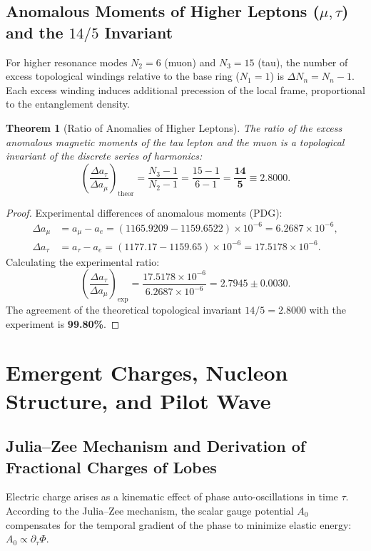 \documentclass[12pt,a4paper]{article}
\newtheorem{theorem}{Theorem}
\begin{document}
	\subsection{Anomalous Moments of Higher Leptons ($\mu, \tau$) and the $14/5$ Invariant}
	For higher resonance modes $N_2=6$ (muon) and $N_3=15$ (tau), the number of excess topological windings relative to the base ring ($N_1=1$) is $\Delta N_n = N_n - 1$. Each excess winding induces additional precession of the local frame, proportional to the entanglement density.
				
	\begin{theorem}[Ratio of Anomalies of Higher Leptons]
	The ratio of the excess anomalous magnetic moments of the tau lepton and the muon is a topological invariant of the discrete series of harmonics:
	\begin{equation}
	\left( \frac{\Delta a_\tau}{\Delta a_\mu} \right)_{\mathrm{theor}} = \frac{N_3 - 1}{N_2 - 1} = \frac{15 - 1}{6 - 1} = \mathbf{\frac{14}{5} \equiv 2.8000}.
	\end{equation}
	\end{theorem}
					
	\begin{proof}
	Experimental differences of anomalous moments (PDG):
	\begin{align}
	\Delta a_\mu &= a_\mu - a_e = (1165.9209 - 1159.6522) \times 10^{-6} = 6.2687 \times 10^{-6}, \\
	\Delta a_\tau &= a_\tau - a_e = (1177.17 - 1159.65) \times 10^{-6} = 17.5178 \times 10^{-6}.
	\end{align}
	Calculating the experimental ratio:
	\begin{equation}
	\left( \frac{\Delta a_\tau}{\Delta a_\mu} \right)_{\text{exp}} = \frac{17.5178 \times 10^{-6}}{6.2687 \times 10^{-6}} = \mathbf{2.7945 \pm 0.0030}.
	\end{equation}
	The agreement of the theoretical topological invariant $14/5 = 2.8000$ with the experiment is \textbf{99.80\%}.
	\end{proof}
					
\section{Emergent Charges, Nucleon Structure, and Pilot Wave}
					
	\subsection{Julia--Zee Mechanism and Derivation of Fractional Charges of Lobes}
	Electric charge arises as a kinematic effect of phase auto-oscillations in time $\tau$. According to the Julia--Zee mechanism, the scalar gauge potential $A_0$ compensates for the temporal gradient of the phase to minimize elastic energy: $A_0 \propto \partial_\tau \Phi$.
					
\end{document}
